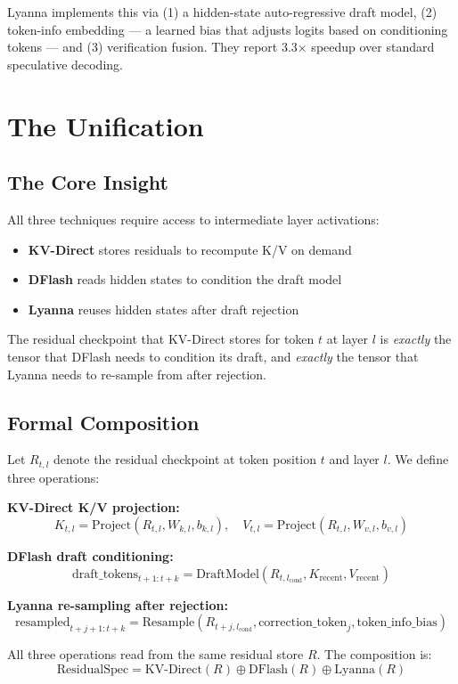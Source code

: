 \documentclass[11pt]{article}
\begin{document}
Lyanna implements this via (1) a hidden-state auto-regressive draft model, (2) token-info embedding — a learned bias that adjusts logits based on conditioning tokens — and (3) verification fusion. They report 3.3$\times$ speedup over standard speculative decoding.

\section{The Unification}

\subsection{The Core Insight}

All three techniques require access to intermediate layer activations:
\begin{itemize}
    \item \textbf{KV-Direct} stores residuals to recompute K/V on demand
    \item \textbf{DFlash} reads hidden states to condition the draft model
    \item \textbf{Lyanna} reuses hidden states after draft rejection
\end{itemize}

The residual checkpoint that KV-Direct stores for token $t$ at layer $l$ is \textit{exactly} the tensor that DFlash needs to condition its draft, and \textit{exactly} the tensor that Lyanna needs to re-sample from after rejection.

\subsection{Formal Composition}

Let $R_{t,l}$ denote the residual checkpoint at token position $t$ and layer $l$. We define three operations:

\textbf{KV-Direct K/V projection:}
$$K_{t,l} = \text{Project}(R_{t,l}, W_{k,l}, b_{k,l}), \quad V_{t,l} = \text{Project}(R_{t,l}, W_{v,l}, b_{v,l})$$

\textbf{DFlash draft conditioning:}
$$\text{draft\_tokens}_{t+1:t+k} = \text{DraftModel}(R_{t, l_{\text{cond}}}, K_{\text{recent}}, V_{\text{recent}})$$

\textbf{Lyanna re-sampling after rejection:}
$$\text{resampled}_{t+j+1:t+k} = \text{Resample}(R_{t+j, l_{\text{cond}}}, \text{correction\_token}_j, \text{token\_info\_bias})$$

All three operations read from the same residual store $R$. The composition is:
$$\text{ResidualSpec} = \text{KV-Direct}(R) \oplus \text{DFlash}(R) \oplus \text{Lyanna}(R)$$
\end{document}
